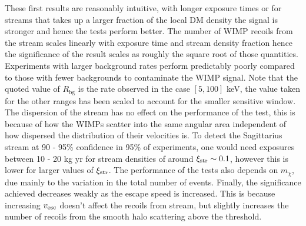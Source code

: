 These first results are reasonably intuitive, with longer exposure times or for streams that takes up a larger fraction of the local DM density the signal is stronger and hence the tests perform better. The number of WIMP recoils from the stream scales linearly with exposure time and stream density fraction hence the significance of the result scales as roughly the square root of those quantities. Experiments with larger background rates perform predictably poorly compared to those with fewer backgrounds to contaminate the WIMP signal. Note that the quoted value of $R_\textrm{bg}$ is the rate observed in the case $[5,100]$ keV, the value taken for the other ranges has been scaled to account for the smaller sensitive window. The dispersion of the stream has no effect on the performance of the test, this is because of how the WIMPs scatter into the same angular area independent of how dispersed the distribution of their velocities is. To detect the Sagittarius stream at 90 - 95\% confidence in 95\% of experiments, one would need exposures between 10 - 20 kg yr for stream densities of around $\xi_{\rm str} \sim 0.1$, however this is lower for larger values of $\xi_{\rm str}$. The performance of the tests also depends on $m_\chi$, due mainly to the variation in the total number of events. Finally, the significance achieved decreases weakly as the escape speed is increased. This is because increasing $v_{\rm esc}$ doesn't affect the recoils from stream, but slightly increases the number of recoils from the smooth halo scattering above the threshold.


